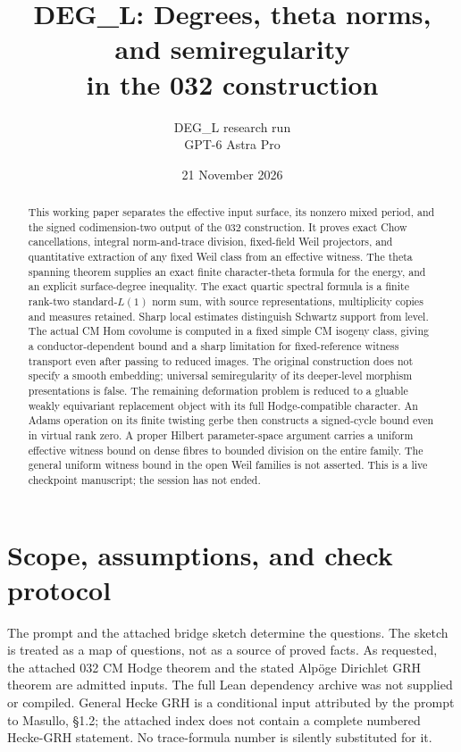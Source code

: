 \documentclass[11pt,a4paper]{article}
\title{DEG\_L: Degrees, theta norms, and semiregularity\\
in the 032 construction}
\author{DEG\_L research run\\GPT-6 Astra Pro}
\date{21 November 2026}
\theoremstyle{definition}
\begin{document}
\maketitle
\begin{abstract}
This working paper separates the effective input surface, its nonzero mixed
period, and the signed codimension-two output of the 032 construction.
It proves exact Chow cancellations, integral norm-and-trace division,
fixed-field Weil projectors, and quantitative extraction of any fixed Weil
class from an effective witness. The theta spanning theorem supplies an
exact finite character-theta formula for the energy, and an explicit
surface-degree inequality. The exact quartic spectral formula is a finite rank-two standard-$L(1)$
norm sum, with source representations, multiplicity copies and measures
retained. Sharp local estimates distinguish Schwartz support from level.
The actual CM Hom covolume is computed in a fixed simple CM isogeny
class, giving a conductor-dependent bound and a sharp limitation for
fixed-reference witness transport even after passing to reduced images.
The original construction does not specify a smooth embedding; universal
semiregularity of its deeper-level morphism presentations is false. The
remaining deformation problem is reduced to a gluable weakly equivariant
replacement object with its full Hodge-compatible character. An Adams
operation on its finite twisting gerbe then constructs a signed-cycle
bound even in virtual rank zero. A proper Hilbert parameter-space
argument carries a uniform effective witness bound on dense fibres to
bounded division on the entire family. The general uniform witness bound
in the open Weil families is not asserted. This is a live checkpoint
manuscript; the session has not ended.
\end{abstract}
\tableofcontents
\clearpage
\section{Scope, assumptions, and check protocol}
The prompt and the attached bridge sketch determine the questions. The
sketch is treated as a map of questions, not as a source of proved facts.
As requested, the attached 032 CM Hodge theorem and the stated Alp\"oge
Dirichlet GRH theorem are admitted inputs. The full Lean dependency archive
was not supplied or compiled. General Hecke GRH is a conditional input
attributed by the prompt to Masullo, \S1.2; the attached index does not
contain a complete numbered Hecke-GRH statement. No trace-formula number
is silently substituted for it.
\end{document}
